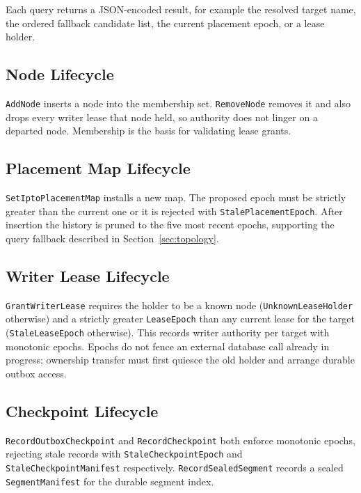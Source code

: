 Each query returns a JSON-encoded result, for example the resolved target name,
the ordered fallback candidate list, the current placement epoch, or a lease
holder.

\subsection{Node Lifecycle}

\texttt{AddNode} inserts a node into the membership set. \texttt{RemoveNode}
removes it and also drops every writer lease that node held, so authority does
not linger on a departed node. Membership is the basis for validating lease
grants.

\subsection{Placement Map Lifecycle}

\texttt{SetIptoPlacementMap} installs a new map. The proposed epoch must be
strictly greater than the current one or it is rejected with
\texttt{StalePlacementEpoch}. After insertion the history is pruned to the five
most recent epochs, supporting the query fallback described in
Section~\ref{sec:topology}.

\subsection{Writer Lease Lifecycle}

\texttt{GrantWriterLease} requires the holder to be a known node
(\texttt{UnknownLeaseHolder} otherwise) and a strictly greater
\texttt{LeaseEpoch} than any current lease for the target
(\texttt{StaleLeaseEpoch} otherwise). This records writer authority per
\ipto{} target with monotonic epochs. Epochs do not fence an external database
call already in progress; ownership transfer must first quiesce the old holder
and arrange durable outbox access.

\subsection{Checkpoint Lifecycle}

\texttt{RecordOutboxCheckpoint} and \texttt{RecordCheckpoint} both enforce
monotonic epochs, rejecting stale records with \texttt{StaleCheckpointEpoch} and
\texttt{StaleCheckpointManifest} respectively. \texttt{RecordSealedSegment}
records a sealed \texttt{SegmentManifest} for the durable segment index.


